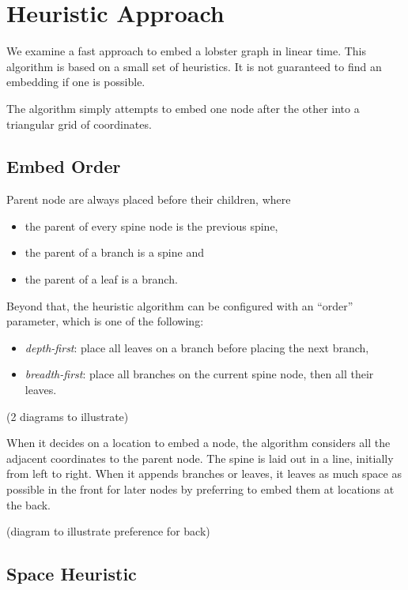 \documentclass{article}
\begin{document}
\section{Heuristic Approach}

We examine a fast approach to embed a lobster graph in linear time.
This algorithm is based on a small set of heuristics.
It is not guaranteed to find an embedding if one is possible.

The algorithm simply attempts to embed one node after the other into a triangular grid of coordinates.

\subsection{Embed Order}

Parent node are always placed before their children, where

\begin{itemize}
    \item the parent of every spine node is the previous spine,
    \item the parent of a branch is a spine and
    \item the parent of a leaf is a branch.
\end{itemize}

Beyond that, the heuristic algorithm can be configured with an ``order'' parameter, which is one of the following:

\begin{itemize}
    \item \emph{depth-first}: place all leaves on a branch before placing the next branch,
    \item \emph{breadth-first}: place all branches on the current spine node, then all their leaves.
\end{itemize}

(2 diagrams to illustrate)

When it decides on a location to embed a node, the algorithm considers all the adjacent coordinates to the parent node.
The spine is laid out in a line, initially from left to right.
When it appends branches or leaves, it leaves as much space as possible in the front for later nodes by preferring to embed them at locations at the back.

(diagram to illustrate preference for back)

\subsection{Space Heuristic}
\end{document}
